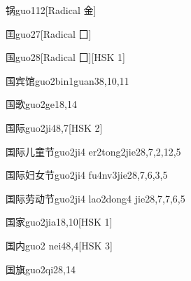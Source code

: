 \begin{entry}{锅}{guo1}{12}[Radical 金]
\end{entry}

\begin{entry}{囯}{guo2}{7}[Radical 囗]
\end{entry}

\begin{entry}{国}{guo2}{8}[Radical ⼞][HSK 1]
\end{entry}

\begin{entry}{国宾馆}{guo2bin1guan3}{8,10,11}
\end{entry}

\begin{entry}{国歌}{guo2ge1}{8,14}
\end{entry}

\begin{entry}{国际}{guo2ji4}{8,7}[HSK 2]
\end{entry}

\begin{entry}{国际儿童节}{guo2ji4 er2tong2jie2}{8,7,2,12,5}
\end{entry}

\begin{entry}{国际妇女节}{guo2ji4 fu4nv3jie2}{8,7,6,3,5}
\end{entry}

\begin{entry}{国际劳动节}{guo2ji4 lao2dong4 jie2}{8,7,7,6,5}
\end{entry}

\begin{entry}{国家}{guo2jia1}{8,10}[HSK 1]
\end{entry}

\begin{entry}{国内}{guo2 nei4}{8,4}[HSK 3]
\end{entry}

\begin{entry}{国旗}{guo2qi2}{8,14}
\end{entry}

